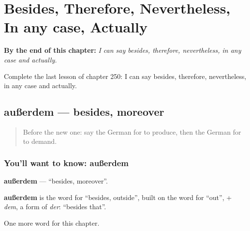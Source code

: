 
\chapter{Besides, Therefore, Nevertheless, In any case, Actually}
\label{ch:ge-besides-therefore-nevertheless-in-any-case-actually}

\begin{chapteropening}
\textbf{By the end of this chapter:} \emph{I can say besides, therefore, nevertheless, in any case and actually.}

Complete the last lesson of chapter 250: I can say besides, therefore, nevertheless, in any case and actually.
\end{chapteropening}

\section[außerdem]{außerdem — besides, moreover}

\label{lesson:GE-C250-ausserdem}



\begin{quote}
Before the new one: say the German for to produce, then the German for to demand.
\end{quote}

\subsection*{You'll want to know: außerdem}
\textbf{außerdem} — \textquotedblleft{}besides, moreover\textquotedblright{}.

\begin{cousinweb}
\textbf{außerdem} is the word for \textquotedblleft{}besides, outside\textquotedblright{}, built on the word for \textquotedblleft{}out\textquotedblright{}, + \emph{dem}, a form of \emph{der}: \textquotedblleft{}besides that\textquotedblright{}.
\end{cousinweb}

\begin{grammarlens}[title={What you've built}]
One more word for this chapter.
\end{grammarlens}

